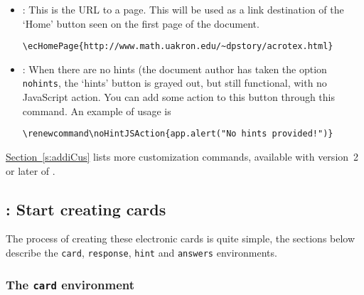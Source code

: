 \documentclass{article}
\begin{document}
\begin{itemize}
\item {}: This is the URL to a page. This will be used as a link destination
    of the `Home' button seen on the first page of the  document.
\begin{Verbatim}[xleftmargin=\amtIndent,fontsize=\small]
\ecHomePage{http://www.math.uakron.edu/~dpstory/acrotex.html}
\end{Verbatim}

\item {}: When there are no hints (the document author has taken the
option \texttt{nohints}, the `hints' button is grayed out, but still functional, with
no JavaScript action. You can add some action to this button through this command.
An example of usage is
\begin{Verbatim}[xleftmargin=\amtIndent,fontsize=\small]
\renewcommand\noHintJSAction{app.alert("No hints provided!")}
\end{Verbatim}
\end{itemize}
\hyperref[s:addiCus]{Section~\ref*{s:addiCus}} lists more customization
commands, available with version~2 or later of .

\subsection{\texorpdfstring{\protect{}}
{\textbackslash{begin\{document\}}}: Start creating cards}

The process of creating these electronic cards is quite simple, the sections below
describe the \texttt{card}, \texttt{response}, \texttt{hint} and \texttt{answers} environments.

\subsubsection{The \texttt{card} environment}\label{ss:cardEnv}
\end{document}
